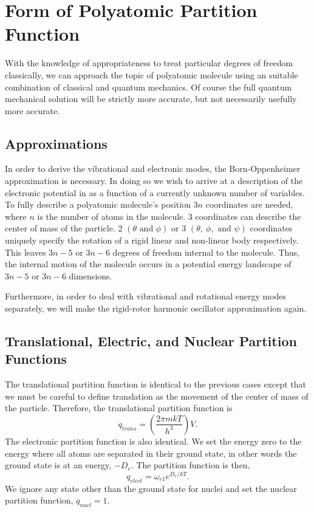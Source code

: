 \section{Form of Polyatomic Partition Function}%
\label{sec:polyppf}
With the knowledge of appropriateness to treat particular degrees of freedom
classically, we can approach the topic of polyatomic molecule using an
suitable combination of classical and quantum mechanics. Of course the full
quantum mechanical solution will be strictly more accurate, but not necessarily
usefully more accurate.
\subsection{Approximations}
In order to derive the vibrational and electronic modes, the Born-Oppenheimer
approximation is necessary. In doing so we wish to arrive at a description of
the electronic potential in as a function of a currently unknown number of
variables. To fully describe a polyatomic molecule's position $3n$ coordinates
are needed, where $n$ is the number of atoms in the molecule. 3 coordinates can
describe the center of mass of the particle. 2 $(\theta \text{ and }\phi)$ or 3
$(\theta,~\phi,\text{ and }\psi)$ coordinates uniquely specify the rotation of a
rigid linear and non-linear body respectively. This leaves $3n - 5$ or $3n - 6$
degrees of freedom internal to the molecule. Thus, the internal motion of the
molecule occurs in a potential energy landscape of $3n - 5$ or $3n - 6$
dimensions.

Furthermore, in order to deal with vibrational and rotational energy modes
separately, we will make the rigid-rotor harmonic oscillator approximation
again.

\subsection{Translational, Electric, and Nuclear Partition Functions}
The translational partition function is identical to the previous cases except
that we must be careful to define translation as the movement of the center of
mass of the particle. Therefore, the translational partition function is
\begin{equation}
	q_{trans} = {\left(\frac{2\pi mkT}{h^3}\right)}V.
\end{equation}
The electronic partition function is also identical. We set the energy zero
to the energy where all atoms are separated in their ground state, in
other words the ground state is at an energy, $-D_e$. The partition function is
then,
\begin{equation*}
	q_{elect} = \omega_{e1} e^{D_{e}/kT}.
\end{equation*}
We ignore any state other than the ground state for nuclei and set the nuclear
partition function, $q_{nucl} = 1$.

